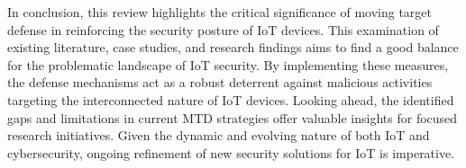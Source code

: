 In conclusion, this review highlights the critical significance of moving target defense in reinforcing the security posture of IoT devices. This examination of existing literature, case studies, and research findings aims to find a good balance for the problematic landscape of IoT security. By implementing these measures, the defense mechanisms act as a robust deterrent against malicious activities targeting the interconnected nature of IoT devices. Looking ahead, the identified gaps and limitations in current MTD strategies offer valuable insights for focused research initiatives. Given the dynamic and evolving nature of both IoT and cybersecurity, ongoing refinement of new security solutions for IoT is imperative.